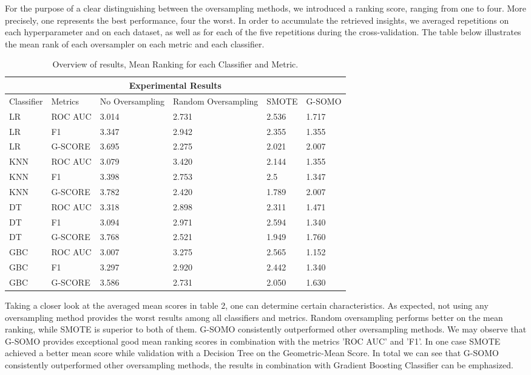 \documentclass[parskip=full]{scrartcl}
\begin{document}
For the purpose of a clear distinguishing between the oversampling methods, we introduced a ranking 
score, ranging from one to four. More precisely, one represents the best performance, four the worst. 
In order to accumulate the retrieved insights, we averaged repetitions on each hyperparameter and 
on each dataset, as well as for each of the five repetitions during the cross-validation. The table 
below illustrates the mean rank of each oversampler on each metric and each classifier. 

\begin{table} [h]
   \scriptsize
   \centering

\begin{tabular}{ |p{1.4cm}||p{2cm}|p{2cm}|p{2cm}|p{2cm}|p{2cm}|  }  
 \hline
 \multicolumn{6}{|c|}{Experimental Results} \\
 \hline
 Classifier & Metrics & No Oversampling & Random Oversampling & SMOTE & G-SOMO \\
 \hline
 
LR&	ROC AUC&	3.014&	2.731&	2.536&	1.717\\
LR&	F1&	3.347&	2.942&	2.355&	1.355\\
LR&	G-SCORE&	3.695&	2.275&	2.021&	2.007\\
KNN&	ROC AUC&	3.079&	3.420&	2.144&	1.355\\
KNN&	F1&	3.398&	2.753&	2.5&	1.347\\
KNN&	G-SCORE&	3.782&	2.420&	1.789&	2.007\\
DT&	ROC AUC&	3.318&	2.898&	2.311&	1.471\\
DT&	F1&	3.094&	2.971&	2.594&	1.340\\
DT&	G-SCORE&	3.768&	2.521&	1.949&	1.760\\
GBC&	ROC AUC&	3.007&	3.275&	2.565&	1.152\\
GBC&	F1&	3.297&	2.920&	2.442&	1.340\\
GBC&	G-SCORE&	3.586&	2.731&	2.050&	1.630\\

 \hline
\end{tabular}

\caption{Overview of results, Mean Ranking for each Classifier and Metric.}
   \label{tab:test}
\end{table} 

Taking a closer look at the averaged mean scores in table 2, one can determine certain characteristics. 
As expected, not using any oversampling method provides the worst results among all classifiers and 
metrics. Random oversampling performs better on the mean ranking, while SMOTE is superior to both of 
them. G-SOMO consistently outperformed other oversampling methods. We may observe that G-SOMO provides 
exceptional good mean ranking scores in combination with the metrics 'ROC AUC' and 'F1'. In one case 
SMOTE achieved a better mean score while validation with a Decision Tree on the Geometric-Mean Score. 
In total we can see that G-SOMO consistently outperformed other oversampling methods, the results in 
combination with Gradient Boosting Classifier can be emphasized. 
\end{document}
